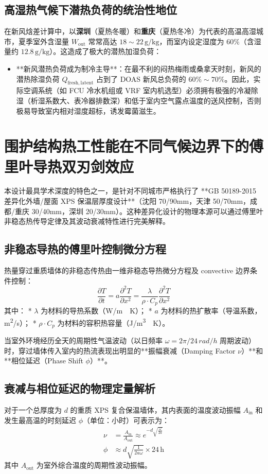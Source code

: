 \documentclass[11pt,a4paper]{article}
\begin{document}
\subsection{高湿热气候下潜热负荷的统治性地位}
在新风焓差计算中，以\textbf{深圳}（夏热冬暖）和\textbf{重庆}（夏热冬冷）为代表的高温高湿城市，夏季室外含湿量 $W_{\mathrm{out}}$ 常常高达 $18 \sim 22\,\mathrm{g/kg}$，而室内设定湿度为 $60\%$（含湿量约 $12.8\,\mathrm{g/kg}$）。这造成了极大的潜热加湿负荷：
\begin{itemize}
    \item **新风潜热负荷成为制冷主导**：在最不利的闷热梅雨或桑拿天时刻，新风的潜热除湿负荷 $Q_{\mathrm{fresh,latent}}$ 占到了 DOAS 新风总负荷的 $60\% \sim 70\%$。因此，实际空调系统（如 FCU 冷水机组或 VRF 室内机选型）必须拥有极强的冷凝除湿（析湿系数大、表冷器排数深）和低于室内空气露点温度的送风控制，否则极易导致室内相对湿度超标，诱发霉菌滋生。
\end{itemize}

\section{围护结构热工性能在不同气候边界下的傅里叶导热双刃剑效应}

本设计最具学术深度的特色之一，是针对不同城市严格执行了 **GB 50189-2015 差异化外墙/屋面 XPS 保温层厚度设计**（沈阳 70/90mm，天津 50/70mm，成都/重庆 30/40mm，深圳 20/30mm）。这种差异化设计的物理本源可以通过傅里叶非稳态热传导定律及其波动衰减特性进行完美解释。

\subsection{非稳态导热的傅里叶控制微分方程}
热量穿过重质墙体的非稳态传热由一维非稳态导热微分方程及 convective 边界条件控制：
\begin{equation}
    \frac{\partial T}{\partial t} = a \frac{\partial^2 T}{\partial x^2} = \frac{\lambda}{\rho \cdot C_p} \frac{\partial^2 T}{\partial x^2}
\end{equation}
其中：
* $\lambda$ 为材料的导热系数（\si{W/m\cdot K}）；
* $a$ 为材料的热扩散率（导温系数，\si{m^2/s}）；
* $\rho \cdot C_p$ 为材料的容积热容量（\si{J/m^3\cdot K}）。

当室外环境经历全天的周期性气温波动（以日频率 $\omega = 2\pi/24\,\si{rad/h}$ 周期波动）时，穿过墙体传入室内的热流表现出明显的**振幅衰减（Damping Factor $\nu$）**和**相位延迟（Phase Shift $\phi$）**。

\subsection{衰减与相位延迟的物理定量解析}
对于一个总厚度为 $d$ 的重质 XPS 复合保温墙体，其内表面的温度波动振幅 $A_{\mathrm{in}}$ 和发生最高温的时刻延迟 $\phi$（单位：小时）可表示为：
\begin{align}
    \nu &= \frac{A_{\mathrm{in}}}{A_{\mathrm{out}}} \approx e^{-d \sqrt{\frac{\omega}{2a}}} \\
    \phi &\approx d \sqrt{\frac{1}{2a\omega}} \times 24\,\mathrm{h}
\end{align}
其中 $A_{\mathrm{out}}$ 为室外综合温度的周期性波动振幅。
\end{document}
